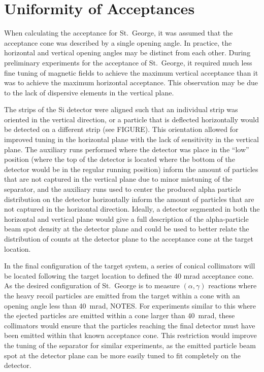 \section{Uniformity of Acceptances}
\label{sec:uniformity-of-acceptances}

When calculating the acceptance for St.\ George, it was assumed that the
acceptance cone was described by a single opening angle. In practice,
the horizontal and vertical opening angles may be distinct from each
other. During preliminary experiments for the acceptance of St.\ George,
it required much less fine tuning of magnetic fields to achieve the
maximum vertical acceptance than it was to achieve the maximum
horizontal acceptance. This observation may be due to the lack of
dispersive elements in the vertical plane.

The strips of the Si detector were aligned such that an individual strip
was oriented in the vertical direction, or a particle that is deflected
horizontally would be detected on a different strip (see FIGURE). This
orientation allowed for improved tuning in the horizontal plane with the
lack of sensitivity in the vertical plane. The auxiliary runs performed
where the detector was place in the ``low'' position (where the top of
the detector is located where the bottom of the detector would be in the
regular running position) inform the amount of particles that are not
captured in the vertical plane due to minor mistuning of the separator,
and the auxiliary runs used to center the produced alpha particle
distribution on the detector horizontally inform the amount of particles
that are not captured in the horizontal direction. Ideally, a detector
segmented in both the horizontal and vertical plane would give a full
description of the alpha-particle beam spot density at the detector
plane and could be used to better relate the distribution of counts at
the detector plane to the acceptance cone at the target location.

In the final configuration of the target system, a series of conical
collimators will be located following the target location to defined the
40 mrad acceptance cone. As the desired configuration of St.\ George is
to measure $(\alpha,\gamma)$ reactions where the heavy recoil particles
are emitted from the target within a cone with an opening angle less
than 40~mrad, NOTES. For experiments similar to this where the ejected
particles are emitted within a cone larger than 40~mrad, these
collimators would ensure that the particles reaching the final detector
must have been emitted within that known acceptance cone. This
restriction would improve the tuning of the separator for similar
experiments, as the emitted particle beam spot at the detector plane can
be more easily tuned to fit completely on the detector.



